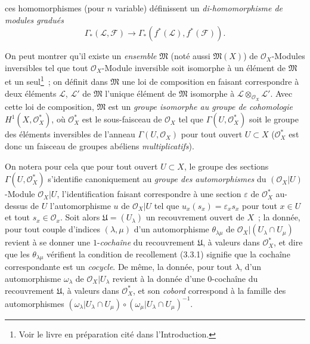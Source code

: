 \begin{env}[5.4.6]

ces homomorphismes (pour $n$ variable) définissent un
\emph{di-homomorphisme de modules gradués}
\[
  \Gamma_*(\mathcal{L},\mathcal{F})
  \longrightarrow
  \Gamma_*(f^*(\mathcal{L}),f^*(\mathcal{F})).
\]
\end{env}

\begin{env}[5.4.7]
On peut montrer qu'il existe un \emph{ensemble} $\mathfrak{M}$ (noté aussi
$\mathfrak{M}(X)$) de $\mathcal{O}_X$-Modules inversibles tel que tout
$\mathcal{O}_X$-Module inversible soit isomorphe à un élément de
$\mathfrak{M}$ et un seul\footnote{Voir le livre en préparation cité dans
l'Introduction.}~; on définit dans $\mathfrak{M}$ une loi de composition en
faisant correspondre à deux éléments $\mathcal{L}$, $\mathcal{L}'$ de
$\mathfrak{M}$ l'unique élément de $\mathfrak{M}$ isomorphe à
$\mathcal{L}\otimes_{\mathcal{O}_X}\mathcal{L}'$. Avec cette loi de
composition, $\mathfrak{M}$ est un \emph{groupe isomorphe au groupe de
cohomologie} $H^1(X,\mathcal{O}_X^*)$, où $\mathcal{O}_X^*$ est le
sous-faisceau de $\mathcal{O}_X$ tel que $\Gamma(U,\mathcal{O}_X^*)$ soit le
groupe des éléments inversibles de l'anneau $\Gamma(U,\mathcal{O}_X)$ pour
tout ouvert $U\subset X$ ($\mathcal{O}_X^*$ est donc un faisceau de groupes
abéliens \emph{multiplicatifs}).

On notera pour cela que pour tout ouvert $U\subset X$, le groupe des sections
$\Gamma(U,\mathcal{O}_X^*)$ s'identifie canoniquement au \emph{groupe des
automorphismes} du $(\mathcal{O}_X|U)$-Module $\mathcal{O}_X|U$,
l'identification faisant correspondre à une section $\varepsilon$ de
$\mathcal{O}_X^*$ au-dessus de $U$ l'automorphisme $u$ de $\mathcal{O}_X|U$
tel que $u_x(s_x)=\varepsilon_xs_x$ pour tout $x\in U$ et tout
$s_x\in\mathcal{O}_x$. Soit alors $\mathfrak{U}=(U_\lambda)$ un recouvrement
ouvert de $X$~; la donnée, pour tout couple d'indices $(\lambda,\mu)$ d'un
automorphisme $\theta_{\lambda\mu}$ de
$\mathcal{O}_X|(U_\lambda\cap U_\mu)$ revient à se donner une
$1$-\emph{cochaîne} du recouvrement $\mathfrak{U}$, à valeurs dans
$\mathcal{O}_X^*$, et dire que les $\theta_{\lambda\mu}$ vérifient la
condition de recollement (3.3.1) signifie que la cochaîne correspondante est
un \emph{cocycle}. De même, la donnée, pour tout $\lambda$, d'un automorphisme
$\omega_\lambda$ de $\mathcal{O}_X|U_\lambda$ revient à la donnée d'une
$0$-cochaîne du recouvrement $\mathfrak{U}$, à valeurs dans
$\mathcal{O}_X^*$, et son \emph{cobord} correspond à la famille des
automorphismes
$(\omega_\lambda|U_\lambda\cap U_\mu)\circ
 (\omega_\mu|U_\lambda\cap U_\mu)^{-1}$.


\end{env}
